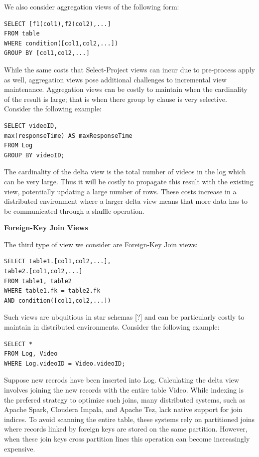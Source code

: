 We also consider aggregation views of the following form:

\begin{lstlisting}
SELECT [f1(col1),f2(col2),...] 
FROM table 
WHERE condition([col1,col2,...]) 
GROUP BY [col1,col2,...]
\end{lstlisting}

While the same costs that Select-Project views can incur due to pre-process
apply as well, aggregation views pose additional challenges to incremental
view maintenance. Aggregation views can be costly to maintain when
the cardinality of the result is large; that is when there group by
clause is very selective. Consider the following example:

\begin{lstlisting}
SELECT videoID, 
max(responseTime) AS maxResponseTime 
FROM Log 
GROUP BY videoID;
\end{lstlisting}

The cardinality of the delta view is the total number of videos in the log which can be very large.
Thus it will be costly to propagate this result with the existing view, potentially updating a large number of rows. 
These costs increase in a distributed environment where a larger
delta view means that more data has to be communicated through a shuffle
operation. 

\vspace{1em}

\noindent\textbf{Foreign-Key Join Views}

The third type of view we consider are Foreign-Key Join views:

\begin{lstlisting}
SELECT table1.[col1,col2,...], 
table2.[col1,col2,...]
FROM table1, table2 
WHERE table1.fk = table2.fk 
AND condition([col1,col2,...]) 
\end{lstlisting}

Such views are ubquitious in star schemas {[}?{]} and can be particularly
costly to maintain in distributed environments. Consider the following example:

\begin{lstlisting}
SELECT * 
FROM Log, Video 
WHERE Log.videoID = Video.videoID;
\end{lstlisting}

Suppose new recrods have been inserted into Log. Calculating the
delta view involves joining the new records with the entire table Video.
While indexing is the prefered strategy to optimize such joins, many
distributed systems, such as Apache Spark, Cloudera Impala, and Apache
Tez, lack native support for join indices. To avoid scanning the entire
table, these systems rely on partitioned joins where records linked
by foreign keys are stored on the same partition. However, when these
join keys cross partition lines this operation can become increasingly
expensive.

